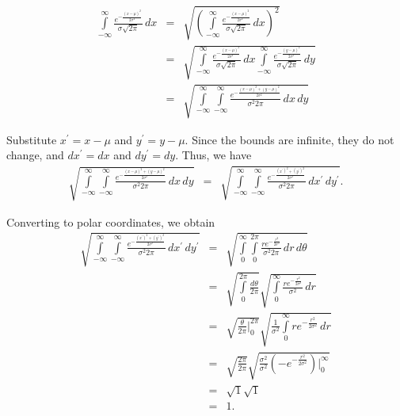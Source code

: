 \documentclass[12pt]{article}
\newcommand{\lint}{\int\limits}
\begin{document}
\begin{eqnarray*}
\lint_{-\infty}^\infty \frac{e^{-\frac{(x-\mu)^2}{2\sigma^2}}}{\sigma\sqrt{2\pi}} \, dx
&=& \sqrt{ \left( \lint_{-\infty}^\infty \frac{e^{-\frac{(x-\mu)^2}{2\sigma^2}}}{\sigma\sqrt{2\pi}} \, dx \right)^2} \\
&=& \sqrt{ \lint_{-\infty}^\infty \frac{e^{-\frac{(x-\mu)^2}{2\sigma^2}}}{\sigma\sqrt{2\pi}} \, dx
\lint_{-\infty}^\infty \frac{e^{-\frac{(y-\mu)^2}{2\sigma^2}}}{\sigma\sqrt{2\pi}} \, dy} \\
&=& \sqrt{ \lint_{-\infty}^\infty \lint_{-\infty}^\infty \frac{e^{-\frac{(x-\mu)^2+(y-\mu)^2}{2\sigma^2}}}{\sigma^2 2\pi} \, dx \, dy}
\end{eqnarray*}

Substitute $x^\prime=x-\mu$ and $y^\prime=y-\mu$.  Since the bounds are infinite, they do not change, and $dx^\prime=dx$ and $dy^\prime=dy$.  Thus, we have
\begin{eqnarray*}
\sqrt{\lint_{-\infty}^\infty \lint_{-\infty}^\infty \frac{e^{-\frac{(x-\mu)^2+(y-\mu)^2}{2\sigma^2}}}{\sigma^2 2\pi} \, dx \, dy}
&=& \sqrt{\lint_{-\infty}^\infty \lint_{-\infty}^\infty \frac{e^{-\frac{(x^\prime)^2+(y^\prime)^2}{2\sigma^2}}}{\sigma^2 2\pi} \, dx^\prime \, dy^\prime}.
\end{eqnarray*}

Converting to polar coordinates, we obtain
\begin{eqnarray*}
\sqrt{\lint_{-\infty}^\infty \lint_{-\infty}^\infty \frac{e^{-\frac{(x^\prime)^2+(y^\prime)^2}{2\sigma^2}}}{\sigma^2 2\pi} \, dx^\prime \, dy^\prime}
&=& \sqrt{\lint_0^\infty \lint_0^{2\pi} \frac{re^{-\frac{r^2}{2\sigma^2}}}{\sigma^2 2\pi} \, dr \, d\theta} \\
&=& \sqrt{\lint_0^{2\pi} \frac{d\theta}{2\pi}} \sqrt{\lint_0^\infty \frac{re^{-\frac{r^2}{2\sigma^2}}}{\sigma^2} \, dr} \\
&=& \sqrt{\frac{\theta}{2\pi}\bigg|_0^{2\pi}} \sqrt{\frac{1}{\sigma^2}\lint_{0}^\infty r e^{-\frac{r^2}{2\sigma^2}} \, dr} \\
&=& \sqrt{\frac{2\pi}{2\pi}} \sqrt{\frac{\sigma^2}{\sigma^2}\left( -e^{-\frac{r^2}{2\sigma^2}} \right)\bigg|_0^\infty} \\
&=& \sqrt{1} \sqrt{1}\\
&=& 1.
\end{eqnarray*}
\end{document}
